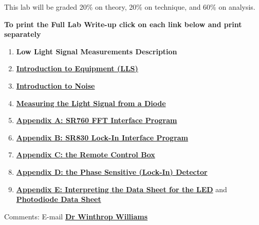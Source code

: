 \documentclass{../lab}
\begin{document}
\noindent This lab will be graded 20\% on theory, 20\% on technique, and 60\% on analysis.


\noindent\textbf{To print the Full Lab Write-up click on each link below and print separately}

\begin{enumerate}
    \item \textbf{Low Light Signal Measurements Description}

    \item \href{https://berkeley-physics111b.github.io/appendices/IntroductiontoEquipment/}{\textbf{Introduction to Equipment (LLS)}}

    \item \href{https://berkeley-physics111b.github.io/appendices/IntroductiontoNoise/}{\textbf{Introduction to Noise}}

    \item \href{https://berkeley-physics111b.github.io/appendices/LightSignal/}{\textbf{Measuring the Light Signal from a Diode}}

    \item \href{https://berkeley-physics111b.github.io/appendices/LLS-Appendix-A-SR760-FFT-Interface-Program/}{\textbf{Appendix A: SR760 FFT Interface Program}}

    \item \href{https://berkeley-physics111b.github.io/appendices/LLS-Appendix-B-SR830-Lock-In-Interface-Program/}{\textbf{Appendix B: SR830 Lock-In Interface Program}}

    \item \href{https://berkeley-physics111b.github.io/appendices/LLS-Appendix-C-the-Remote-Control-Box/}{\textbf{Appendix C: the Remote Control Box}}

    \item \href{https://berkeley-physics111b.github.io/appendices/LLS-Appendix-D-the-Phase-Sensitive-Lock-In-Detector/}{\textbf{Appendix D: the Phase Sensitive (Lock-In) Detector}}

    \item \href{https://berkeley-physics111b.github.io/appendices/LLS-Appendix-E-Interpreting-the-Data-Sheet-for-the-LED/}{\textbf{Appendix E: Interpreting the Data Sheet for the LED}} and \href{https://berkeley-physics111b.github.io/appendices/LLS-Diode-data-sheets/}{\textbf{Photodiode Data Sheet}}

\end{enumerate}

\noindent Comments: E-mail \href{\MailLabManager}{\textbf{Dr Winthrop Williams}}
\end{document}
